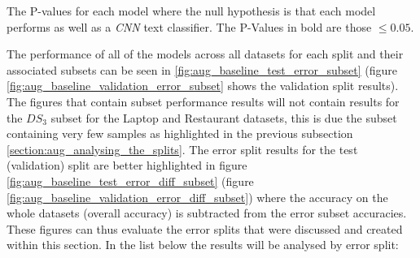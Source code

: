 \begin{table}[ht!]
    \centering
    
    \caption{The P-values for each model where the null hypothesis is that each model performs as well as a \textit{CNN} text classifier. The P-Values in bold are those $\leq 0.05$.}
    \label{tab:augmentation_baseline_tdsa_text_classifier_p_values}
\end{table}

The performance of all of the models across all datasets for each split and their associated subsets can be seen in \ref{fig:aug_baseline_test_error_subset} (figure \ref{fig:aug_baseline_validation_error_subset} shows the validation split results). The figures that contain subset performance results will not contain results for the $DS_3$ subset for the Laptop and Restaurant datasets, this is due the subset containing very few samples as highlighted in the previous subsection \ref{section:aug_analysing_the_splits}. The error split results for the test (validation) split are better highlighted in figure \ref{fig:aug_baseline_test_error_diff_subset} (figure \ref{fig:aug_baseline_validation_error_diff_subset}) where the accuracy on the whole datasets (overall accuracy) is subtracted from the error subset accuracies. These figures can thus evaluate the error splits that were discussed and created within this section. In the list below the results will be analysed by error split:

